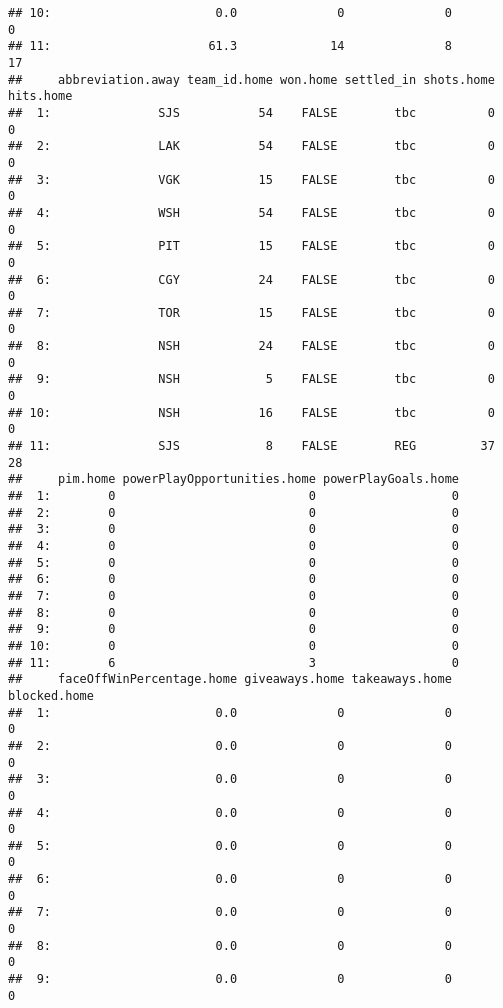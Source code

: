 \documentclass[
]{article}
\begin{document}
\begin{verbatim}
## 10:                       0.0              0              0            0
## 11:                      61.3             14              8           17
##     abbreviation.away team_id.home won.home settled_in shots.home hits.home
##  1:               SJS           54    FALSE        tbc          0         0
##  2:               LAK           54    FALSE        tbc          0         0
##  3:               VGK           15    FALSE        tbc          0         0
##  4:               WSH           54    FALSE        tbc          0         0
##  5:               PIT           15    FALSE        tbc          0         0
##  6:               CGY           24    FALSE        tbc          0         0
##  7:               TOR           15    FALSE        tbc          0         0
##  8:               NSH           24    FALSE        tbc          0         0
##  9:               NSH            5    FALSE        tbc          0         0
## 10:               NSH           16    FALSE        tbc          0         0
## 11:               SJS            8    FALSE        REG         37        28
##     pim.home powerPlayOpportunities.home powerPlayGoals.home
##  1:        0                           0                   0
##  2:        0                           0                   0
##  3:        0                           0                   0
##  4:        0                           0                   0
##  5:        0                           0                   0
##  6:        0                           0                   0
##  7:        0                           0                   0
##  8:        0                           0                   0
##  9:        0                           0                   0
## 10:        0                           0                   0
## 11:        6                           3                   0
##     faceOffWinPercentage.home giveaways.home takeaways.home blocked.home
##  1:                       0.0              0              0            0
##  2:                       0.0              0              0            0
##  3:                       0.0              0              0            0
##  4:                       0.0              0              0            0
##  5:                       0.0              0              0            0
##  6:                       0.0              0              0            0
##  7:                       0.0              0              0            0
##  8:                       0.0              0              0            0
##  9:                       0.0              0              0            0

\end{verbatim}
\end{document}
